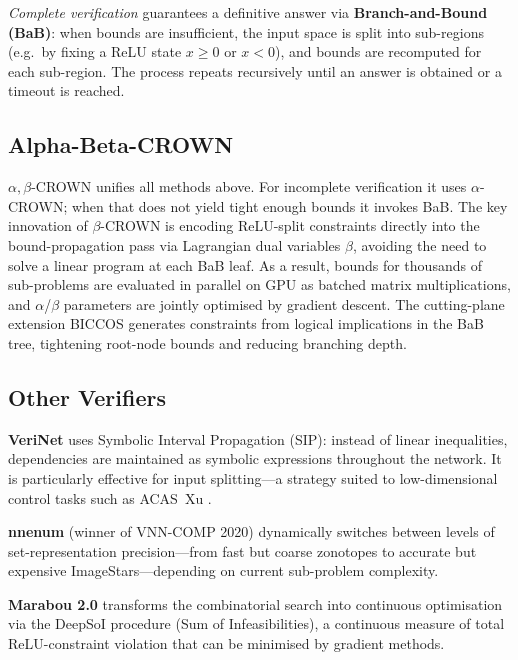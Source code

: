 \documentclass[11pt]{article}
\begin{document}
\emph{Complete verification} \citep{betaCROWN2021} guarantees a definitive
answer via \textbf{Branch-and-Bound (BaB)}: when bounds are insufficient, the
input space is split into sub-regions (e.g.\ by fixing a ReLU state
$x \geq 0$ or $x < 0$), and bounds are recomputed for each sub-region. The
process repeats recursively until an answer is obtained or a timeout is reached.

\subsection{Alpha-Beta-CROWN}

$\alpha,\beta$-CROWN \citep{AlphaBetaCrownVNNCOMP23} unifies all methods above.
For incomplete verification it uses $\alpha$-CROWN; when that does not yield
tight enough bounds it invokes BaB. The key innovation of $\beta$-CROWN
\citep{betaCROWN2021} is encoding ReLU-split constraints directly into the
bound-propagation pass via Lagrangian dual variables $\beta$, avoiding the need
to solve a linear program at each BaB leaf. As a result, bounds for thousands
of sub-problems are evaluated in parallel on GPU as batched matrix
multiplications, and $\alpha$/$\beta$ parameters are jointly optimised by
gradient descent. The cutting-plane extension BICCOS
\citep{NeurIPS2024BnbCuttingPlanes} generates constraints from logical
implications in the BaB tree, tightening root-node bounds and reducing
branching depth.

\subsection{Other Verifiers}

\textbf{VeriNet} uses Symbolic Interval Propagation (SIP): instead of linear
inequalities, dependencies are maintained as symbolic expressions throughout the
network. It is particularly effective for input splitting---a strategy suited to
low-dimensional control tasks such as ACAS~Xu \citep{IntervalReachabilityAnalysis}.

\textbf{nnenum} \citep{NNEnumPaper} (winner of VNN-COMP 2020) dynamically
switches between levels of set-representation precision---from fast but coarse
zonotopes to accurate but expensive ImageStars---depending on current sub-problem
complexity.

\textbf{Marabou 2.0} \citep{arXiv2401Marabou2} transforms the combinatorial
search into continuous optimisation via the DeepSoI procedure (Sum of
Infeasibilities), a continuous measure of total ReLU-constraint violation that
can be minimised by gradient methods.
\end{document}
